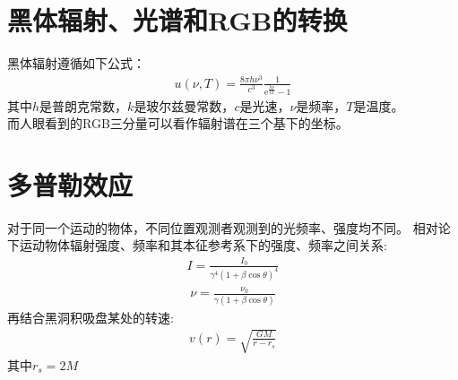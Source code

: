 \documentclass[a4paper, 12pt]{article}
\begin{document}
    \section{黑体辐射、光谱和RGB的转换}
    黑体辐射遵循如下公式：
    \begin{align*}
        u(\nu,T) = \frac{8\pi h\nu^3}{c^3} \frac{1}{\mathrm e^{\frac{h\nu}{kT}} - 1}
    \end{align*}
    其中$h$是普朗克常数，$k$是玻尔兹曼常数，$c$是光速，$\nu$是频率，$T$是温度。\\

    而人眼看到的RGB三分量可以看作辐射谱在三个基下的坐标。

    \section{多普勒效应}
    对于同一个运动的物体，不同位置观测者观测到的光频率、强度均不同。
    相对论下运动物体辐射强度、频率和其本征参考系下的强度、频率之间关系:
    \begin{align*}
        I = \frac{I_0}{\gamma^4(1+\beta\cos\theta)^4}
    \end{align*}
    \begin{align*}
        \nu = \frac{\nu_0}{\gamma(1+\beta\cos\theta)}
    \end{align*}
    再结合黑洞积吸盘某处的转速:
    \begin{align*}
        v(r) = \sqrt{\frac{GM}{r - r_s}}
    \end{align*}
    其中$r_s = 2M$
\end{document}
